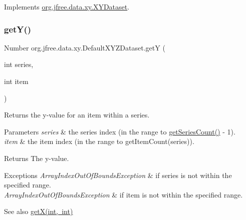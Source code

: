 Implements \mbox{\hyperlink{interfaceorg_1_1jfree_1_1data_1_1xy_1_1_x_y_dataset_a65bd212539d8f7dfb3d3d36b5f42e083}{org.\+jfree.\+data.\+xy.\+X\+Y\+Dataset}}.

\mbox{\label{classorg_1_1jfree_1_1data_1_1xy_1_1_default_x_y_z_dataset_adcfdc1d2da9d58dae9cd6d2a006be1af}} 
\subsubsection{\texorpdfstring{get\+Y()}{getY()}}
{\footnotesize\ttfamily Number org.\+jfree.\+data.\+xy.\+Default\+X\+Y\+Z\+Dataset.\+getY (\begin{DoxyParamCaption}\item[{int}]{series,  }\item[{int}]{item }\end{DoxyParamCaption})}

Returns the y-\/value for an item within a series.


\begin{DoxyParams}{Parameters}
{\em series} & the series index (in the range {} to {\ttfamily \mbox{\hyperlink{classorg_1_1jfree_1_1data_1_1xy_1_1_default_x_y_z_dataset_a115138a06afdc19d3526ef73fabf578e}{get\+Series\+Count()}} -\/ 1}). \\
\hline
{\em item} & the item index (in the range {} to {\ttfamily get\+Item\+Count(series)}).\\
\hline
\end{DoxyParams}
\begin{DoxyReturn}{Returns}
The y-\/value.
\end{DoxyReturn}

\begin{DoxyExceptions}{Exceptions}
{\em Array\+Index\+Out\+Of\+Bounds\+Exception} & if {\ttfamily series} is not within the specified range. \\
\hline
{\em Array\+Index\+Out\+Of\+Bounds\+Exception} & if {\ttfamily item} is not within the specified range.\\
\hline
\end{DoxyExceptions}
\begin{DoxySeeAlso}{See also}
\mbox{\hyperlink{classorg_1_1jfree_1_1data_1_1xy_1_1_default_x_y_z_dataset_a46a17db4f8c6013a1ff779529478c221}{get\+X(int, int)}} 
\end{DoxySeeAlso}


